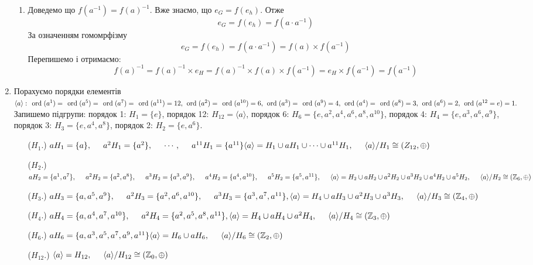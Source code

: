 \documentclass[a4paper,12pt]{article}
\newcommand{\ord}[0]{\textrm{\hspace*{0.15cm}ord\hspace*{0.1cm}}}
\newcommand\tab[1][0.5cm]{\hspace*{#1}}
\begin{document}
\begin{justify}
\begin{enumerate}
\begin{enumerate}
				\item Доведемо що $f(a^{-1})=f(a)^{-1}$. Вже знаємо, що $e_G=f(e_h)$. Отже $$e_G=f(e_h)=f(a\cdot a^{-1})$$ За означенням гомомрфізму $$e_G=f(e_h)=f(a\cdot a^{-1})=f(a)\times f(a^{-1})$$ Перепишемо і отримаємо: $$f(a)^{-1}=f(a)^{-1}\times e_H=f(a)^{-1}\times f(a)\times f(a^{-1})=e_H\times f(a^{-1})=f(a^{-1})$$
			\end{enumerate}
			\item Порахуємо порядки елементів $\langle a\rangle:\ord(a^1)=\ord(a^5)=\ord(a^7)=\ord(a^{11})=12,\ord(a^2)=\ord(a^{10})=6,\ord(a^3)=\ord(a^9)=4,\ord(a^4)=\ord(a^8)=3,\ord(a^6)=2,\ord(a^{12}=e)=1.\\$ Запишемо підгрупи: порядок 1: $H_1=\{e\}$, порядок 12: $H_{12}=\langle a\rangle$, порядок 6: $H_6=\{e,a^2,a^4,a^6,a^8,a^{10}\}$, порядок 4: $H_4=\{e,a^3,a^6,a^9\}$, порядок 3: $H_3=\{e,a^4,a^8\}$, порядок 2: $H_2=\{e,a^6\}$. 
				\begin{itemize}
					\item [($H_1$.)] $aH_1=\{a\},\tab a^2H_1=\{a^2\},\tab\cdots,\tab a^{11}H_1=\{a^{11}\}\\\langle a\rangle=H_1\cup aH_1\cup\dots\cup a^{11}H_1,\tab \langle a\rangle/H_1\cong(Z_{12},\oplus)$
					\item [($H_2$.)] $aH_2=\{a^1,a^7\},\tab a^2H_2=\{a^2,a^8\},\tab a^3H_2=\{a^3,a^9\},\tab a^4H_2=\{a^4,a^{10}\},\tab  a^5H_2=\{a^5,a^{11}\},\tab \langle a\rangle=H_2\cup aH_2\cup a^2H_2\cup a^3H_2\cup a^4H_2\cup a^5H_2,\tab \langle a\rangle/H_2\cong(\mathbb{Z}_6,\oplus)$
					\item [($H_3$.)] $aH_3=\{a,a^5,a^9\},\tab a^2H_3=\{a^2,a^6,a^{10}\},\tab a^3H_3=\{a^3,a^7,a^{11}\},\\\langle a\rangle=H_4\cup aH_3\cup a^2H_3\cup a^3H_3,\tab \langle a\rangle/H_3\cong(\mathbb{Z}_4,\oplus)$
					\item [($H_4$.)] $aH_4=\{a,a^4,a^7,a^{10}\},\tab a^2H_4=\{a^2,a^5,a^8,a^{11}\},\\\langle a\rangle=H_4\cup aH_4\cup a^2H_4,\tab \langle a\rangle/H_4\cong(\mathbb{Z}_3,\oplus)$
					\item [($H_6$.)] $aH_6=\{a,a^3,a^5,a^7,a^9,a^{11}\}\\\langle a\rangle=H_6\cup aH_6,\tab \langle a\rangle/H_6\cong(\mathbb{Z}_2,\oplus)$
					\item [($H_{12}$.)] $\langle a\rangle=H_{12},\tab \langle a\rangle/H_{12}\cong(\mathbb{Z}_0,\oplus)$
				\end{itemize} 
 		\end{enumerate}
 		
	\end{justify}
\end{document}

